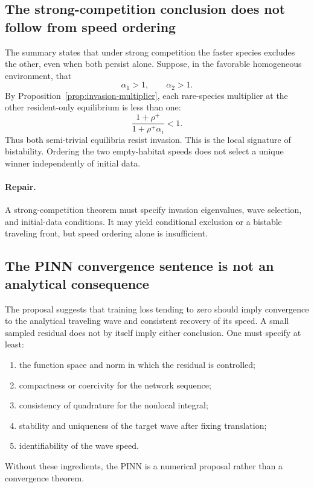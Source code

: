 \documentclass[11pt]{article}
\theoremstyle{definition}
\begin{document}
\subsection{The strong-competition conclusion does not follow from speed
ordering}

The summary states that under strong competition the faster species excludes
the other, even when both persist alone.  Suppose, in the favorable
homogeneous environment, that
\[
  \alpha_1>1,\qquad \alpha_2>1.
\]
By Proposition~\ref{prop:invasion-multiplier}, each rare-species multiplier
at the other resident-only equilibrium is less than one:
\[
  \frac{1+\rho^+}{1+\rho^+\alpha_i}<1.
\]
Thus both semi-trivial equilibria resist invasion.  This is the local
signature of bistability.  Ordering the two empty-habitat speeds does not
select a unique winner independently of initial data.

\paragraph{Repair.}
A strong-competition theorem must specify invasion eigenvalues, wave
selection, and initial-data conditions.  It may yield conditional exclusion
or a bistable traveling front, but speed ordering alone is insufficient.

\subsection{The PINN convergence sentence is not an analytical consequence}

The proposal suggests that training loss tending to zero should imply
convergence to the analytical traveling wave and consistent recovery of its
speed.  A small sampled residual does not by itself imply either conclusion.
One must specify at least:
\begin{enumerate}[label=(\roman*)]
  \item the function space and norm in which the residual is controlled;
  \item compactness or coercivity for the network sequence;
  \item consistency of quadrature for the nonlocal integral;
  \item stability and uniqueness of the target wave after fixing translation;
  \item identifiability of the wave speed.
\end{enumerate}
Without these ingredients, the PINN is a numerical proposal rather than a
convergence theorem.
\end{document}
